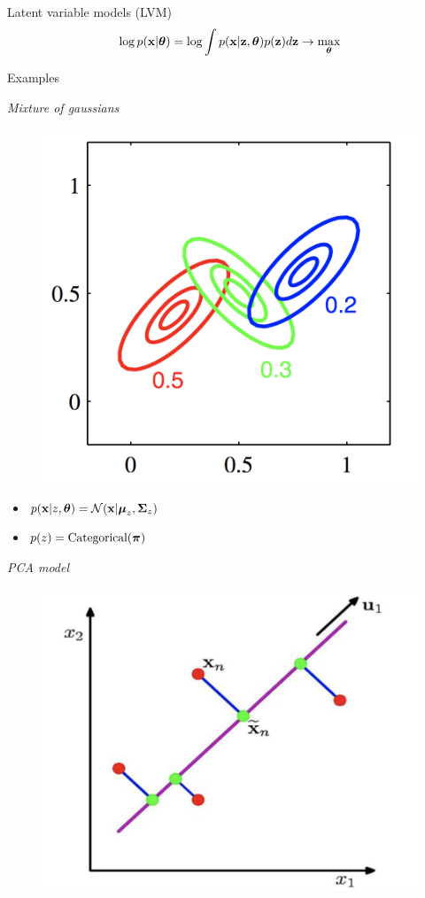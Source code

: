 \begin{frame}{Latent variable models (LVM)}
	\[
	\log p(\mathbf{x} | \boldsymbol{\theta}) = \log \int p(\mathbf{x} | \mathbf{z}, \boldsymbol{\theta}) p(\mathbf{z}) d\mathbf{z} \rightarrow \max_{\boldsymbol{\theta}}
	\]
	\vspace{-0.6cm}
	\begin{block}{Examples}
		\begin{minipage}[t]{0.45\columnwidth}
			\textit{Mixture of gaussians} \\
			\vspace{-0.5cm}
			\begin{figure}
				\centering
				\includegraphics[width=0.75\linewidth]{figs/mixture_of_gaussians}
			\end{figure}
			\vspace{-0.5cm}
			\begin{itemize}
				\item $p(\mathbf{x} | z, \boldsymbol{\theta}) = \mathcal{N}(\mathbf{x} | \boldsymbol{\mu}_z, \boldsymbol{\Sigma}_z)$
				\item $p(z) = \text{Categorical}(\boldsymbol{\pi})$
			\end{itemize}
		\end{minipage}%
		\begin{minipage}[t]{0.53\columnwidth}
			\textit{PCA model} \\
			\vspace{-0.5cm}
			\begin{figure}
				\centering
				\includegraphics[width=.7\linewidth]{figs/pca}

\end{figure}
\end{minipage}
\end{block}
\end{frame}
